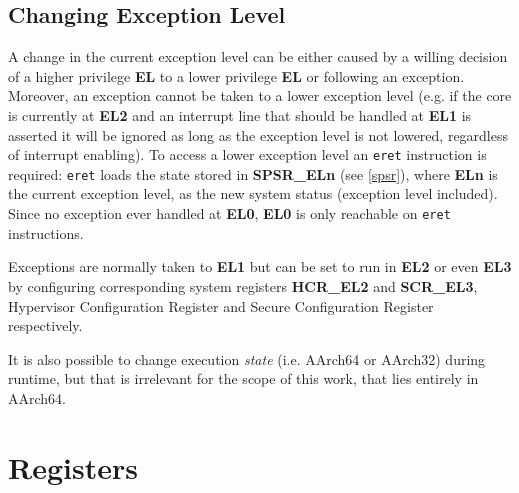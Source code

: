 \documentclass[12pt,a4paper,openright,twoside]{report}
\begin{document}
\subsection{Changing Exception Level}
A change in the current exception level can be either caused by a willing decision
of a higher privilege \textbf{EL} to a lower privilege \textbf{EL} or following 
an exception. Moreover, an exception cannot be taken to a lower exception level (e.g. if the core 
is currently at \textbf{EL2} and an interrupt line that should be handled
at \textbf{EL1} is asserted it will be ignored as long as the exception
level is not lowered, regardless of interrupt enabling). 
To access a lower exception level an {\tt eret} instruction is required: {\tt eret}
loads the state stored in \textbf{SPSR\_ELn} (see \ref{spsr}), where \textbf{ELn} 
is the current exception level, as the new system status (exception level included).
Since no exception ever handled at \textbf{EL0}, \textbf{EL0} is only reachable 
on {\tt eret} instructions.

Exceptions are normally taken to \textbf{EL1} but can be set to run in \textbf{EL2}
or even \textbf{EL3} by configuring corresponding system registers \textbf{HCR\_EL2}
and \textbf{SCR\_EL3}, Hypervisor Configuration Register and Secure Configuration
Register respectively. 

It is also possible to change execution \textit{state} (i.e. AArch64 or AArch32)
during runtime, but that is irrelevant for the scope of this work, that lies
entirely in AArch64.

\section{Registers}
\end{document}
